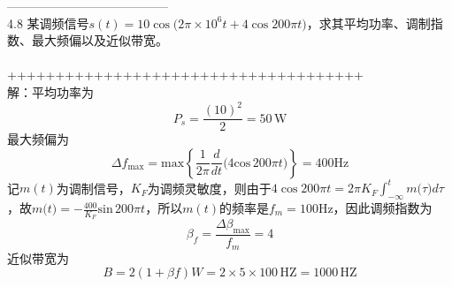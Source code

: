 \documentclass[utf8]{article}
\begin{document}
---------------------------------------\\
4.8 某调频信号$s(t)=10\cos\bigl(2\pi\times10^{6}t+4\cos200\pi t\bigr)$，求其平均功率、调制指数、最大频偏以及近似带宽。\\
\\
+++++++++++++++++++++++++++++++++++++\\
解：平均功率为
$$P_{s}={\frac{\left(10\right)^{2}}{2}}=50\,\mathrm{W}$$
最大频偏为$$\Delta\!f_{\mathrm{max}}=\mathrm{max}\left\{\frac{1}{2\pi}\frac{d}{d t}\big(4\mathrm{cos}\,200\pi t\big)\right\}=400\mathrm{Hz}$$
记$m(t)$为调制信号，$K_{F}$为调频灵敏度，则由于$4\cos200\pi t=2\pi K_{F}\int_{-\infty}^{t}m\bigl(\tau\bigr)d\tau$，故$m\bigl(t\bigr)=-\frac{400}{K_{F}}\mathrm{sin}\,200\pi t$，所以$m(t)$的频率是$f_{m}=100\mathrm{Hz}$，因此调频指数为
$$\beta_{f}={\frac{\Delta\beta_{\mathrm{max}}}{f_{m}}}=4$$
近似带宽为
$$B=2(1+\beta f)W=2\times5\times100\,\mathrm{HZ}=1000\,\mathrm{HZ}$$
\end{document}

